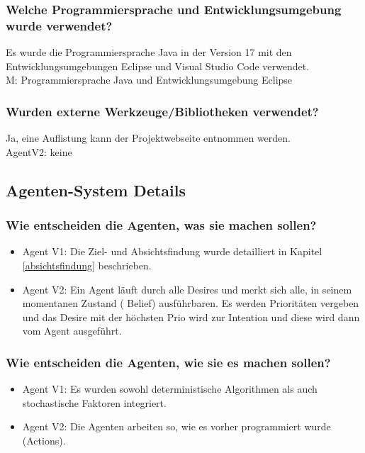 \documentclass[runningheads]{llncs}
\begin{document}
\subsubsection{Welche Programmiersprache und Entwicklungsumgebung wurde verwendet?\\}
Es wurde die Programmiersprache Java in der Version 17 mit den Entwicklungsumgebungen Eclipse und Visual Studio Code verwendet. \\
M: Programmiersprache Java und Entwicklungsumgebung Eclipse
\subsubsection{Wurden externe Werkzeuge/Bibliotheken verwendet?\\}
Ja, eine Auflistung kann der Projektwebseite \cite{Site} entnommen werden. \\
AgentV2: keine
\subsection{Agenten-System Details}
\subsubsection{Wie entscheiden die Agenten, was sie machen sollen?}
\begin{itemize}
\item Agent V1: Die Ziel- und Absichtsfindung wurde detailliert in Kapitel \ref{absichtsfindung} beschrieben. \\
\item Agent V2: Ein Agent läuft durch alle Desires und merkt sich alle, in seinem momentanen Zustand ( Belief) ausführbaren. Es werden Prioritäten vergeben und das Desire mit der höchsten Prio wird zur Intention und diese wird dann vom Agent ausgeführt.
\end{itemize}


\subsubsection{Wie entscheiden die Agenten, wie sie es machen sollen?}
\begin{itemize}
\item Agent V1: Es wurden sowohl deterministische Algorithmen als auch stochastische Faktoren integriert.
\item Agent V2: Die Agenten arbeiten so, wie es vorher programmiert wurde (Actions).
\end{itemize}
\end{document}
